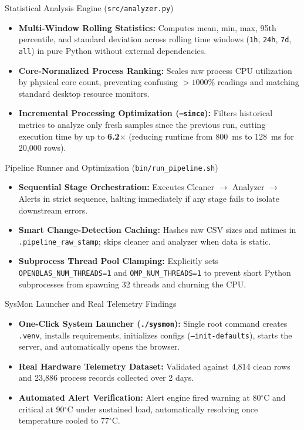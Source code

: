\documentclass[aspectratio=169,10pt]{beamer}
\begin{document}
\begin{frame}{Statistical Analysis Engine (\texttt{src/analyzer.py})}
    \begin{itemize}
        \setlength{\itemsep}{10pt}
        \item \textbf{Multi-Window Rolling Statistics:} Computes mean, min, max, 95th percentile, and standard deviation across rolling time windows (\texttt{1h}, \texttt{24h}, \texttt{7d}, \texttt{all}) in pure Python without external dependencies.
        \item \textbf{Core-Normalized Process Ranking:} Scales raw process CPU utilization by physical core count, preventing confusing $>1000\%$ readings and matching standard desktop resource monitors.
        \item \textbf{Incremental Processing Optimization (\texttt{--since}):} Filters historical metrics to analyze only fresh samples since the previous run, cutting execution time by up to \textbf{6.2$\times$} (reducing runtime from 800~ms to 128~ms for 20,000 rows).
    \end{itemize}
\end{frame}

\begin{frame}{Pipeline Runner and Optimization (\texttt{bin/run\_pipeline.sh})}
    \begin{itemize}
        \setlength{\itemsep}{10pt}
        \item \textbf{Sequential Stage Orchestration:} Executes Cleaner $\rightarrow$ Analyzer $\rightarrow$ Alerts in strict sequence, halting immediately if any stage fails to isolate downstream errors.
        \item \textbf{Smart Change-Detection Caching:} Hashes raw CSV sizes and mtimes in \texttt{.pipeline\_raw\_stamp}; skips cleaner and analyzer when data is static.
        \item \textbf{Subprocess Thread Pool Clamping:} Explicitly sets \texttt{OPENBLAS\_NUM\_THREADS=1} and \texttt{OMP\_NUM\_THREADS=1} to prevent short Python subprocesses from spawning 32 threads and churning the CPU.
    \end{itemize}
\end{frame}

\begin{frame}{SysMon Launcher and Real Telemetry Findings}
    \begin{itemize}
        \setlength{\itemsep}{10pt}
        \item \textbf{One-Click System Launcher (\texttt{./sysmon}):} Single root command creates \texttt{.venv}, installs requirements, initializes configs (\texttt{--init-defaults}), starts the server, and automatically opens the browser.
        \item \textbf{Real Hardware Telemetry Dataset:} Validated against 4,814 clean rows and 23,886 process records collected over 2 days.
        \item \textbf{Automated Alert Verification:} Alert engine fired warning at 80$^\circ$C and critical at 90$^\circ$C under sustained load, automatically resolving once temperature cooled to 77$^\circ$C.
    \end{itemize}
\end{frame}
\end{document}
